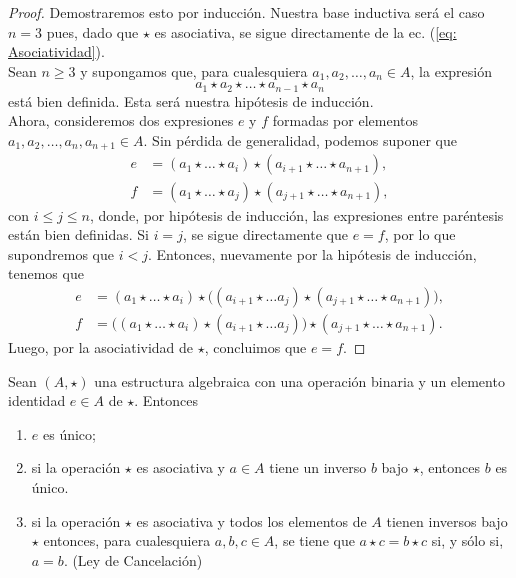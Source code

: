 \documentclass[notasLineal]{subfiles}
\begin{document}
\begin{proof}
    Demostraremos esto por inducción. Nuestra base inductiva será el caso $n=3$ pues, dado que $\star$ es asociativa, se sigue directamente de la ec. (\ref{eq: Asociatividad}). \\

    Sean $n\ge 3$ y supongamos que, para cualesquiera $a_1,a_2,\dots,a_n\in A$, la expresión
    \begin{equation}\label{eq: Hipótesis de inducción}
        a_1\star a_2\star\dots\star a_{n-1}\star a_n
    \end{equation} está bien definida. Esta será nuestra hipótesis de inducción. \\

    Ahora, consideremos dos expresiones $e$ y $f$ formadas por elementos $a_1,a_2,\dots,a_n,a_{n+1}\in A$. Sin pérdida de generalidad, podemos suponer que
    \begin{align*}
        e &= (a_1\star\dots\star a_i)\star(a_{i+1}\star\dots\star a_{n+1}), \\
        f &= (a_1\star\dots\star a_j)\star(a_{j+1}\star\dots\star a_{n+1}),
    \end{align*}
    con $i\le j\le n$, donde, por hipótesis de inducción, las expresiones entre paréntesis están bien definidas. Si $i=j$, se sigue directamente que $e=f$, por lo que supondremos que $i<j$. Entonces, nuevamente por la hipótesis de inducción, tenemos que
    \begin{align*}
        e &= (a_1\star\dots\star a_i)\star\big((a_{i+1}\star\dots a_j)\star(a_{j+1}\star\dots\star a_{n+1})\big), \\
        f &= \big((a_1\star\dots\star a_i)\star(a_{i+1}\star\dots a_j)\big)\star(a_{j+1}\star\dots\star a_{n+1}).
    \end{align*}
    Luego, por la asociatividad de $\star$, concluimos que $e=f$.
\end{proof}

\begin{Prop}\label{Prop: Operación binaria con identidad}
    Sean $(A,\star)$ una estructura algebraica con una operación binaria y un elemento identidad $e\in A$ de $\star$. Entonces

    \begin{enumerate}[label=(\alph*)]
        \item $e$ es único;

        \item si la operación $\star$ es asociativa y $a\in A$ tiene un inverso $b$ bajo $\star$, entonces $b$ es único.

        \item si la operación $\star$ es asociativa y todos los elementos de $A$ tienen inversos bajo $\star$ entonces, para cualesquiera $a,b,c\in A$, se tiene que $a\star c=b\star c$ si, y sólo si, $a=b$. (Ley de Cancelación)
    \end{enumerate}
\end{Prop}
    
\end{document}
